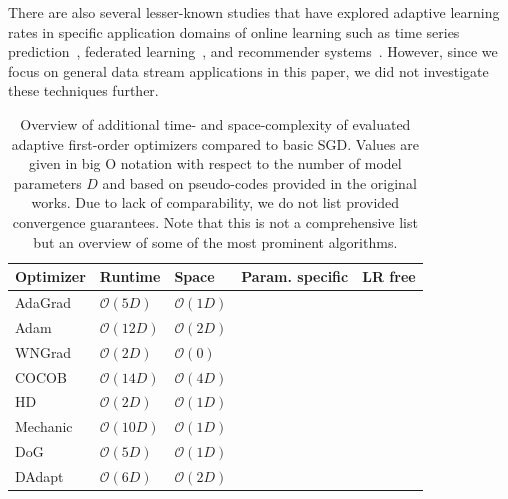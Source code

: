 \documentclass[letterpaper]{article} %
\newcommand{\cmark}{\ding{51}} %
\newcommand{\xmark}{\ding{55}} %
\begin{document}
There are also several lesser-known studies that have explored adaptive learning rates in specific application domains of online learning such as time series prediction~\cite{miyaguchiCograConceptDriftAwareStochastic2019, fekriDeepLearningLoad2021, zhangPOLAOnlineTime2021a}, federated learning~\cite{canonacoAdaptiveFederatedLearning2021}, and recommender systems~\cite{ferreirajoseADADRIFTAdaptiveLearning2020}.
However, since we focus on general data stream applications in this paper, we did not investigate these techniques further. 

\begin{table}[ht]
	\centering
	\small
	\begin{tabular}{@{}lllcc@{}}
		\toprule
		Optimizer                & Runtime            & Space             & Param. specific & LR free \\ \midrule
		AdaGrad                  & $\mathcal{O}(5D)$  & $\mathcal{O}(1D)$ & \cmark          & \xmark  \\
		Adam                     & $\mathcal{O}(12D)$ & $\mathcal{O}(2D)$ & \cmark          & \xmark  \\
		WNGrad                   & $\mathcal{O}(2D)$  & $\mathcal{O}(0)$  & \xmark          & \xmark  \\
		COCOB                    & $\mathcal{O}(14D)$ & $\mathcal{O}(4D)$ & \cmark          & \cmark  \\
		HD \footnotemark[1]      & $\mathcal{O}(2D)$  & $\mathcal{O}(1D)$ & \xmark          & \xmark  \\
		Mechanic                 & $\mathcal{O}(10D)$ & $\mathcal{O}(1D)$ & \cmark          & \cmark  \\
		DoG   \footnotemark[1]   & $\mathcal{O}(5D)$  & $\mathcal{O}(1D)$ & \xmark          & \cmark  \\
		DAdapt  \footnotemark[1] & $\mathcal{O}(6D)$  & $\mathcal{O}(2D)$ & \xmark          & \cmark  \\
		\bottomrule
	\end{tabular}
	\caption{Overview of additional time- and space-complexity of evaluated adaptive first-order optimizers compared to basic SGD. Values are given in big O notation with respect to the number of model parameters $D$ and based on pseudo-codes provided in the original works. Due to lack of comparability, we do not list provided convergence guarantees. Note that this is not a comprehensive list but an overview of some of the most prominent algorithms.}\label{tab:param_free_optims}
\end{table}
\end{document}
